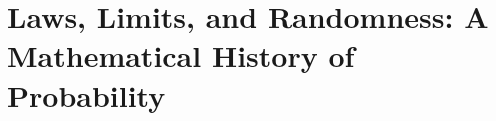 \section{Laws, Limits, and Randomness: A Mathematical History of Probability} \label{chapter:four_CLT}


